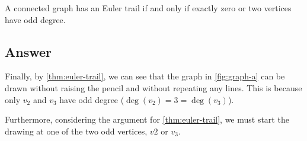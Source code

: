 \begin{proposition} \label{thm:euler-trail}
    A connected graph has an Euler trail if and only if exactly zero or two vertices have odd degree.
\end{proposition}

\subsection{Answer}

    Finally, by \cref{thm:euler-trail}, we can see that the graph in \cref{fig:graph-a} can be drawn without raising the pencil and without repeating any lines. This is because only $v_2$ and $v_3$ have odd degree ($\deg(v_2) = 3 = \deg(v_3)$).

    Furthermore, considering the argument for \cref{thm:euler-trail}, we must start the drawing at one of the two odd vertices, $v2$ or $v_3$.
